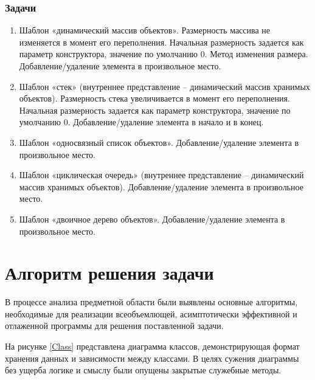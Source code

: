 \documentclass[a4paper,12pt]{article}
\begin{document}
\subsubsection*{Задачи}

\begin{enumerate}
	
\item
Шаблон «динамический массив объектов».
Размерность массива не изменяется в момент его переполнения.
Начальная размерность задается как параметр конструктора, значение по умолчанию 0.
Метод изменения размера.
Добавление/удаление элемента в произвольное место.

\item
Шаблон «стек» (внутреннее представление – динамический массив хранимых объектов).
Размерность стека увеличивается в момент его переполнения.
Начальная размерность задается как параметр конструктора, значение по умолчанию 0.
Добавление/удаление элемента в начало и в конец.

\item
Шаблон «односвязный список объектов».
Добавление/удаление элемента в произвольное место.

\item
Шаблон «циклическая очередь» (внутреннее представление – динамический массив хранимых объектов).
Добавление/удаление элемента в произвольное место.

\item
Шаблон «двоичное дерево объектов».
Добавление/удаление элемента в произвольное место.

\end{enumerate}

\cleardoublepage

\section{Алгоритм решения задачи}

В процессе анализа предметной области были выявлены основные алгоритмы, необходимые для реализации всеобъемлющей, асимптотически эффективной и отлаженной программы для решения поставленной задачи.

На рисунке \ref{Class} представлена диаграмма классов, демонстрирующая формат хранения данных и зависимости между классами.
В целях сужения диаграммы без ущерба логике и смыслу были опущены закрытые служебные методы.
\end{document}

